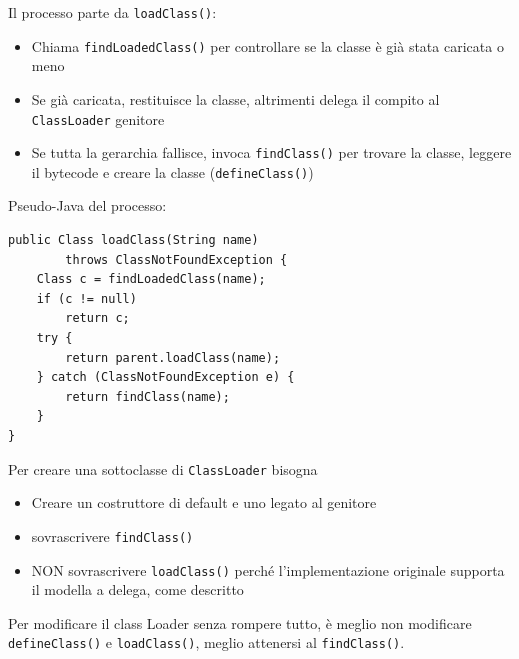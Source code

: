 Il processo parte da \texttt{loadClass()}:
\begin{itemize}
    \item Chiama \texttt{findLoadedClass()} per controllare se la classe è già stata caricata o meno

    \item Se già caricata, restituisce la classe, altrimenti delega il compito al \texttt{ClassLoader} genitore

    \item Se tutta la gerarchia fallisce, invoca \texttt{findClass()} per trovare la classe, leggere il bytecode e creare la classe (\texttt{defineClass()})
\end{itemize}
Pseudo-Java del processo:
\begin{verbatim}
public Class loadClass(String name)
        throws ClassNotFoundException {
    Class c = findLoadedClass(name);
    if (c != null)
        return c;
    try {
        return parent.loadClass(name);
    } catch (ClassNotFoundException e) {
        return findClass(name);
    }
}
\end{verbatim}

Per creare una sottoclasse di \texttt{ClassLoader} bisogna
\begin{itemize}
    \item Creare un costruttore di default e uno legato al genitore

    \item sovrascrivere \texttt{findClass()}

    \item NON sovrascrivere \texttt{loadClass()} perché l'implementazione originale supporta il modella a delega, come descritto
\end{itemize}

Per modificare il class Loader senza rompere tutto, è meglio non modificare \texttt{defineClass()} e \texttt{loadClass()}, meglio attenersi al \texttt{findClass()}.

